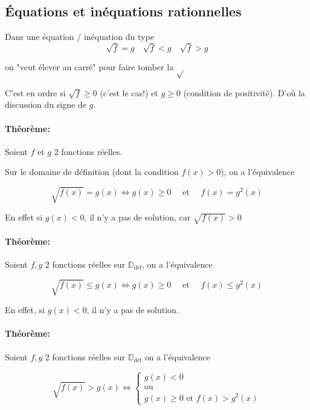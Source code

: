 \documentclass[
    11pt,
    a4paper,
    oneside,
    headinlcude, footinclude,
    twoside,
]{report}
\begin{document}
\subsection{Équations et inéquations rationnelles}

Dans une équation / inéquation du type
$$\sqrt{f} = g \quad \sqrt{f} < g \quad \sqrt{f} > g$$

on "veut élever au carré" pour faire tomber la $\sqrt{}$ %

C'est en ordre si $\sqrt{f} \geq 0$ (c'est le cas!) et $g \geq 0$ (condition
de positivité). D'où la discussion du signe de $g$.

\paragraph{Théorème:}

Soient $f$ et $g$ 2 fonctions réelles.

Sur le domaine de définition (dont la condition $f(x) > 0$), on a
l'équivalence 
\begin{highlightBox}
    $$\sqrt{f(x)} = g(x) \iff g(x) \geq 0 \quad \text{ et } \quad f(x) = g^{2}(x)$$
\end{highlightBox}

En effet si $g(x) < 0$, il n'y a pas de solution, car $\sqrt{f(x)} > 0$

\paragraph{Théorème:}

Soient $f, g$ 2 fonctions réelles sur $\mathbb{D}_{\text{déf}}$, on a
l'équivalence 

\begin{highlightBox}
    $$\sqrt{f(x)} \leq g(x) \iff g(x) \geq 0 \quad \text{ et } \quad f(x) \leq
    g^{2}(x)$$
\end{highlightBox}

En effet, si $g(x)< 0$, il n'y a pas de solution.

\paragraph{Théorème:}

Soient $f, g$ 2 fonctions réelles sur $\mathbb{D}_{\text{déf}}$ on a
l'équivalence 

\begin{highlightBox}
    $$\sqrt{f(x)} > g(x) \iff 
    \left\{
        \begin{array}{l}
        g(x) < 0\\
        \text{ou}\\
        g(x) \geq 0 \text{ et } f(x) > g^{2}(x)
        \end{array}
    \right.$$
\end{highlightBox}
\end{document}
